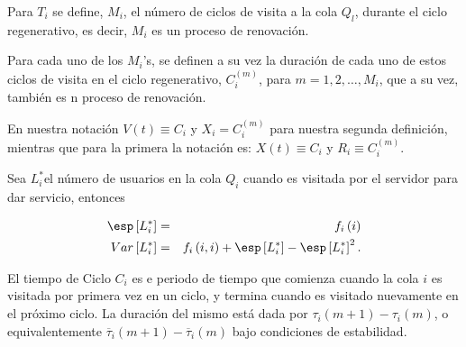 \begin{Def}
Para $T_{i}$ se define, $M_{i}$, el n\'umero de ciclos de visita a la cola $Q_{l}$, durante el ciclo regenerativo, es decir, $M_{i}$ es un proceso de renovaci\'on.
\end{Def}

\begin{Def}
Para cada uno de los $M_{i}$'s, se definen a su vez la duraci\'on de cada uno de estos ciclos de visita en el ciclo regenerativo, $C_{i}^{(m)}$, para $m=1,2,\ldots,M_{i}$, que a su vez, tambi\'en es n proceso de renovaci\'on.
\end{Def}

En nuestra notaci\'on $V\left(t\right)\equiv C_{i}$ y $X_{i}=C_{i}^{(m)}$ para nuestra segunda definici\'on, mientras que para la primera la notaci\'on es: $X\left(t\right)\equiv C_{i}$ y $R_{i}\equiv C_{i}^{(m)}$.




\begin{Def}
Sea $L_{i}^{*}$el n\'umero de usuarios en la cola $Q_{i}$ cuando es visitada por el servidor para dar servicio, entonces

\begin{eqnarray}
\esp\left[L_{i}^{*}\right]&=&f_{i}\left(i\right)\\
Var\left[L_{i}^{*}\right]&=&f_{i}\left(i,i\right)+\esp\left[L_{i}^{*}\right]-\esp\left[L_{i}^{*}\right]^{2}.
\end{eqnarray}

\end{Def}

\begin{Def}
El tiempo de Ciclo $C_{i}$ es e periodo de tiempo que comienza cuando la cola $i$ es visitada por primera vez en un ciclo, y termina cuando es visitado nuevamente en el pr\'oximo ciclo. La duraci\'on del mismo est\'a dada por $\tau_{i}\left(m+1\right)-\tau_{i}\left(m\right)$, o equivalentemente $\overline{\tau}_{i}\left(m+1\right)-\overline{\tau}_{i}\left(m\right)$ bajo condiciones de estabilidad.
\end{Def}



